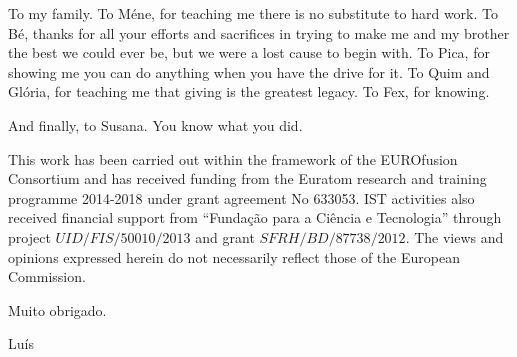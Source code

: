 To my family. To Méne, for teaching me there is no substitute to hard work. To Bé, thanks for all your efforts and sacrifices in trying to make me and my brother the best we could ever be, but we were a lost cause to begin with. To Pica, for showing me you can do anything when you have the drive for it. To Quim and Glória, for teaching me that giving is the greatest legacy. To Fex, for knowing.

And finally, to Susana. You know what you did.

\vspace{5mm}

This work has been carried out within the framework of the EUROfusion Consortium and has received funding from the Euratom research and training programme 2014-2018 under grant agreement No 633053. IST activities also received financial support from ``Funda\c{c}\~ao para a Ci\^{e}ncia e Tecnologia'' through project $UID/FIS/50010/2013$ and grant $SFRH/BD/87738/2012$. The views and opinions expressed herein do not necessarily reflect those of the European Commission.

\begin{flushright}
Muito obrigado.

Luís
\end{flushright}
